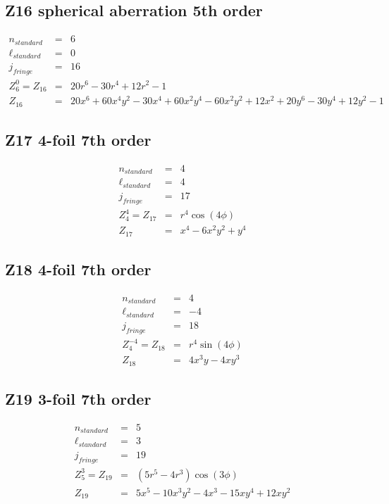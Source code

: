 \documentclass[10pt]{article}
\begin{document}
  \subsection{Z16 spherical aberration 5th order}
    \begin{subequations}
    \begin{eqnarray}
        n_{standard} &=&6\\
        \ell_{standard} &=&0\\
        j_{fringe} &=&16\\
        Z_{6}^{0} = Z_{16} &=& 20 r^{6} - 30 r^{4} + 12 r^{2} - 1\\
        Z_{16} &=& 20 x^{6} + 60 x^{4} y^{2} - 30 x^{4} + 60 x^{2} y^{4} - 60 x^{2} y^{2} + 12 x^{2} + 20 y^{6} - 30 y^{4} + 12 y^{2} - 1
    \end{eqnarray}
    \end{subequations}
  \subsection{Z17 4-foil 7th order}
    \begin{subequations}
    \begin{eqnarray}
        n_{standard} &=&4\\
        \ell_{standard} &=&4\\
        j_{fringe} &=&17\\
        Z_{4}^{4} = Z_{17} &=& r^{4} \cos{\left(4 \phi \right)}\\
        Z_{17} &=& x^{4} - 6 x^{2} y^{2} + y^{4}
    \end{eqnarray}
    \end{subequations}
  \subsection{Z18 4-foil 7th order}
    \begin{subequations}
    \begin{eqnarray}
        n_{standard} &=&4\\
        \ell_{standard} &=&-4\\
        j_{fringe} &=&18\\
        Z_{4}^{-4} = Z_{18} &=& r^{4} \sin{\left(4 \phi \right)}\\
        Z_{18} &=& 4 x^{3} y - 4 x y^{3}
    \end{eqnarray}
    \end{subequations}
  \subsection{Z19 3-foil 7th order}
    \begin{subequations}
    \begin{eqnarray}
        n_{standard} &=&5\\
        \ell_{standard} &=&3\\
        j_{fringe} &=&19\\
        Z_{5}^{3} = Z_{19} &=& \left(5 r^{5} - 4 r^{3}\right) \cos{\left(3 \phi \right)}\\
        Z_{19} &=& 5 x^{5} - 10 x^{3} y^{2} - 4 x^{3} - 15 x y^{4} + 12 x y^{2}
    \end{eqnarray}
    \end{subequations}
\end{document}
